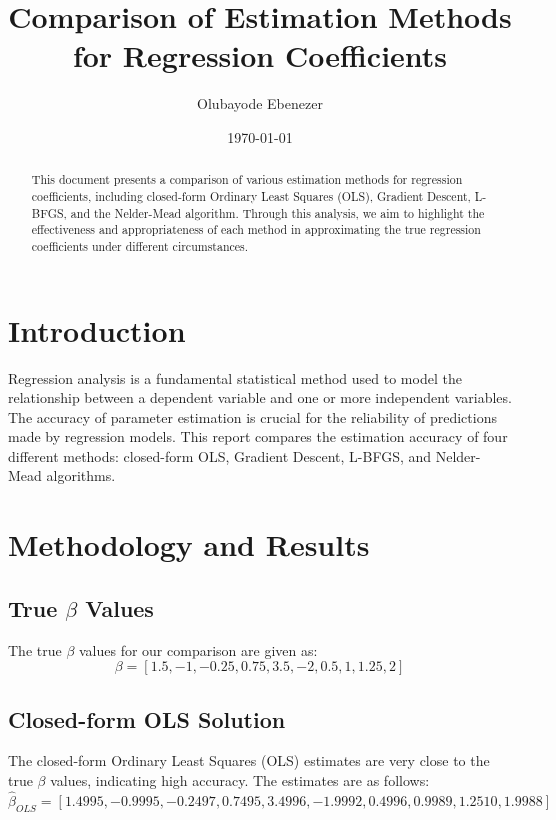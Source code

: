 \documentclass[12pt]{article}
\title{Comparison of Estimation Methods for Regression Coefficients}
\author{Olubayode Ebenezer}
\date{\today}
\begin{document}
\maketitle

\begin{abstract}
This document presents a comparison of various estimation methods for regression coefficients, including closed-form Ordinary Least Squares (OLS), Gradient Descent, L-BFGS, and the Nelder-Mead algorithm. Through this analysis, we aim to highlight the effectiveness and appropriateness of each method in approximating the true regression coefficients under different circumstances.
\end{abstract}

\section{Introduction}
Regression analysis is a fundamental statistical method used to model the relationship between a dependent variable and one or more independent variables. The accuracy of parameter estimation is crucial for the reliability of predictions made by regression models. This report compares the estimation accuracy of four different methods: closed-form OLS, Gradient Descent, L-BFGS, and Nelder-Mead algorithms.

\section{Methodology and Results}

\subsection{True $\beta$ Values}
The true $\beta$ values for our comparison are given as:
\[ \beta = [1.5, -1, -0.25, 0.75, 3.5, -2, 0.5, 1, 1.25, 2] \]

\subsection{Closed-form OLS Solution}
The closed-form Ordinary Least Squares (OLS) estimates are very close to the true $\beta$ values, indicating high accuracy. The estimates are as follows:
\[ \hat{\beta}_{OLS} = [1.4995, -0.9995, -0.2497, 0.7495, 3.4996, -1.9992, 0.4996, 0.9989, 1.2510, 1.9988] \]
\end{document}
